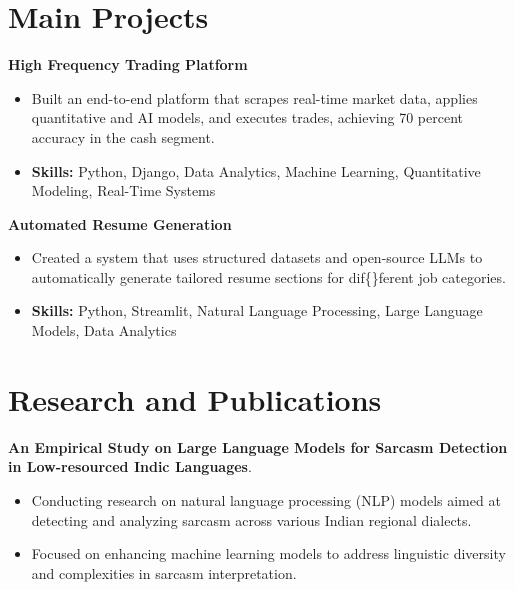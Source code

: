 \documentclass[a4paper,11pt]{article}
\begin{document}
\section{\textbf{Main Projects}}

\vspace{1mm}
  \textbf{High Frequency Trading Platform  }
\vspace{-1.5mm} %
\begin{itemize}
  \item Built an end-to-end platform that scrapes real-time market data, applies quantitative and AI models, and executes trades, achieving 70 percent accuracy in the cash segment.
\vspace{-3mm}
  \item \textbf{Skills:} Python, Django, Data Analytics, Machine Learning, Quantitative Modeling, Real-Time Systems
\end{itemize}


\vspace{1mm}
   \textbf{Automated Resume Generation }
\vspace{-1.5mm} %
\begin{itemize}
  \item Created a system that uses structured datasets and open-source LLMs to automatically generate tailored resume sections for dif\{\}ferent job categories.
\vspace{-3mm}
  \item \textbf{Skills:} Python, Streamlit, Natural Language Processing, Large Language Models, Data Analytics
\end{itemize}



\section{\textbf{Research and Publications} \hfill }
\vspace{1mm}
  \textbf{An Empirical Study on Large Language Models for Sarcasm Detection in Low-resourced Indic Languages}.
\vspace{-1mm} %
\begin{itemize}
  \item Conducting research on natural language processing (NLP) models aimed at detecting and analyzing sarcasm across various Indian regional dialects.
\vspace{-3mm}
  \item Focused on enhancing machine learning models to address linguistic diversity and complexities in sarcasm interpretation.
\end{itemize}
\end{document}
